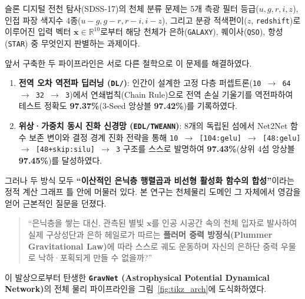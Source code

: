 \documentclass[11pt,a4paper]{article}
\begin{document}
슬론 디지털 전천 탐사(SDSS-17)의 천체 분류 문제는 5개 측광 필터 등급($u, g, r, i, z$), 인접 파장 색지수 4종($u-g, g-r, r-i, i-z$), 그리고 분광 적색편이($z$, \texttt{redshift})로 이루어진 입력 벡터 $\mathbf{x} \in \mathbb{R}^{10}$로부터 해당 천체가 은하(\texttt{GALAXY}), 퀘이사(\texttt{QSO}), 항성(\texttt{STAR}) 중 무엇인지 판별하는 과제이다.

앞서 구축한 두 파이프라인은 서로 다른 철학으로 이 문제를 해결하였다.
\begin{enumerate}[leftmargin=18pt, itemsep=2pt]
  \item \textbf{전역 오차 역전파 딥러닝 (\texttt{DL/})}: 인간이 설계한 고정 다층 퍼셉트론(\texttt{10 $\rightarrow$ 64 $\rightarrow$ 32 $\rightarrow$ 3})에서 연쇄법칙(Chain Rule)으로 전역 손실 기울기를 역전파하여 테스트 정확도 \textbf{97.37\%}(3-Seed 앙상블 \textbf{97.42\%})를 기록하였다.
  \item \textbf{위상·가중치 동시 진화 신경망 (\texttt{EDL/TWEANN})}: 8개의 독립된 섬에서 Net2Net 함수 보존 변이와 결정 경계 진화 전략을 통해 \texttt{10 $\rightarrow$ [104:gelu] $\rightarrow$ [48:gelu] $\rightarrow$ [48+skip:silu] $\rightarrow$ 3} 구조를 스스로 발명하여 \textbf{97.43\%}(상위 4섬 앙상블 \textbf{97.45\%})를 달성하였다.
\end{enumerate}

그러나 두 방식 모두 \textbf{``이산적인 은닉층 행렬곱과 비선형 활성화 함수의 합성''}이라는 정적 계산 그래프 틀 안에 머물러 있다. 본 연구는 천체물리 도메인 그 자체에서 영감을 얻어 근본적인 질문을 던졌다.

\begin{quote}
\color{NavyAccent}
``은닉층을 쌓는 대신, 관측된 별빛 $\mathbf{x}$를 인공 시공간 속의 천체 입자로 발사하여 실제 구상성단과 은하 헤일로가 따르는 \textbf{플러머 중력 방정식(Plummer Gravitational Law)}에 따라 스스로 궤도 운동하며 자신의 은하단 중력 우물로 낙하·포획되게 만들 수 없을까?''
\end{quote}

이 발상으로부터 탄생한 \textbf{\texttt{GravNet} (Astrophysical Potential Dynamical Network)}의 전체 물리 파이프라인을 그림~\ref{fig:tikz_arch}에 도식화하였다.
\end{document}
